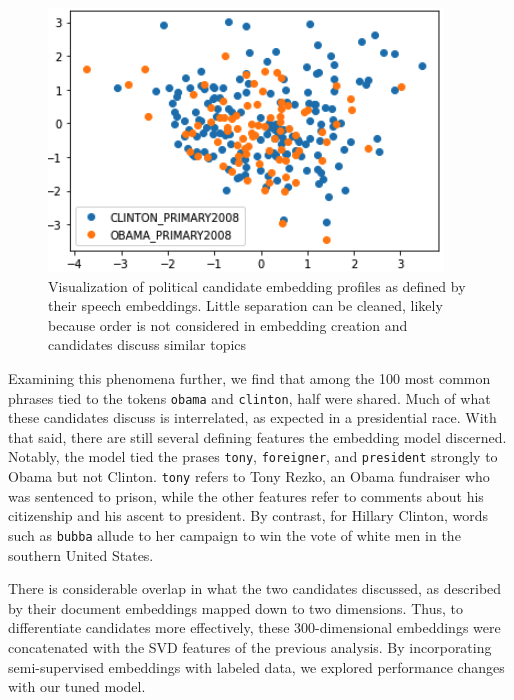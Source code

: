 \documentclass[11pt,a4paper]{article}
\begin{document}
\begin{figure}[htpb]
  \centering
  \includegraphics[width=1\linewidth]{imgs/PCA_w2v_Obama.png}
  \caption{Visualization of political candidate embedding profiles
  as defined by their speech embeddings. Little separation can be cleaned,
likely because order is not considered in embedding creation and candidates discuss similar topics}%
  \label{fig:imgs/PCA_w2v_Obama}
  \vspace{-10pt}
\end{figure}

Examining this phenomena further, we find that among the 100 most common phrases tied to the tokens \texttt{obama} and \texttt{clinton}, half were shared. Much of what these candidates discuss is interrelated, as expected in a presidential race. With that said, there are still several defining features the embedding model discerned. Notably, the model tied the prases \texttt{tony}, \texttt{foreigner}, and \texttt{president} strongly to Obama but not Clinton. \texttt{tony} refers to Tony Rezko, an Obama fundraiser who was sentenced to prison, while the other features refer to comments about his citizenship and his ascent to president. By contrast, for Hillary Clinton, words such as \texttt{bubba} allude to her campaign to win the vote of white men in the southern United States.

There is considerable overlap in what the two candidates discussed, as described by their document embeddings mapped down to two dimensions. Thus, to differentiate candidates more effectively, these 300-dimensional embeddings were concatenated with the SVD features of the previous analysis. By incorporating semi-supervised embeddings with labeled data, we explored performance changes with our tuned model.
\end{document}
